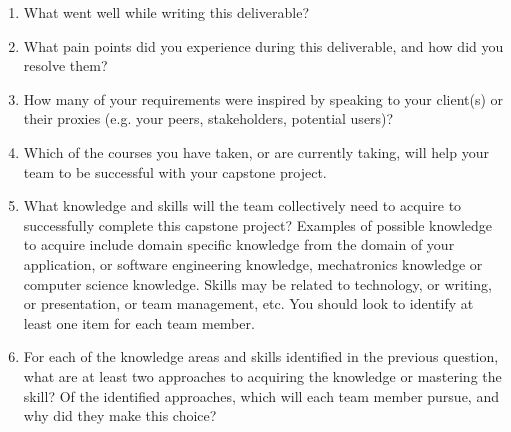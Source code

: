 \documentclass[12pt]{article}
\begin{document}
\begin{enumerate}
  \item What went well while writing this deliverable? 
  \item What pain points did you experience during this deliverable, and how did
  you resolve them?
  \item How many of your requirements were inspired by speaking to your
  client(s) or their proxies (e.g. your peers, stakeholders, potential users)?
  \item Which of the courses you have taken, or are currently taking, will help
  your team to be successful with your capstone project.
  \item What knowledge and skills will the team collectively need to acquire to
  successfully complete this capstone project?  Examples of possible knowledge
  to acquire include domain specific knowledge from the domain of your
  application, or software engineering knowledge, mechatronics knowledge or
  computer science knowledge.  Skills may be related to technology, or writing,
  or presentation, or team management, etc.  You should look to identify at
  least one item for each team member.
  \item For each of the knowledge areas and skills identified in the previous
  question, what are at least two approaches to acquiring the knowledge or
  mastering the skill?  Of the identified approaches, which will each team
  member pursue, and why did they make this choice?
\end{enumerate}
\end{document}
